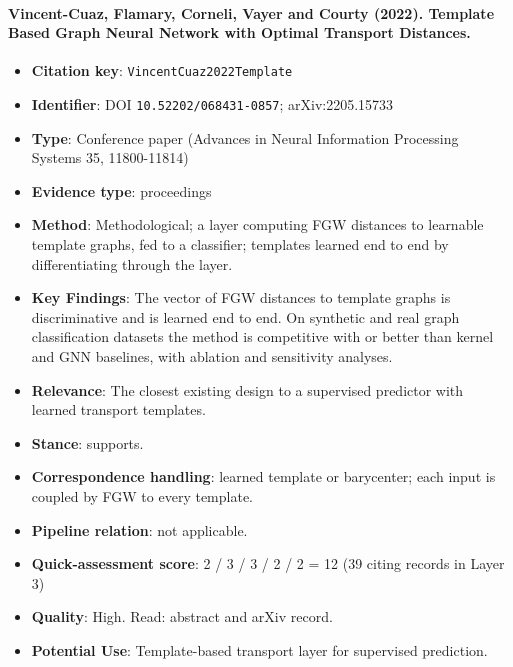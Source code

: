 \documentclass[journal,onecolumn]{IEEEtran}
\begin{document}
\paragraph{Vincent-Cuaz, Flamary, Corneli, Vayer and Courty (2022). Template Based Graph Neural Network with Optimal Transport Distances.~\cite{VincentCuaz2022Template}}\mbox{}

\begin{itemize}

\item{} \textbf{Citation key}: \texttt{VincentCuaz2022Template}

\item{} \textbf{Identifier}: DOI \nolinkurl{10.52202/068431-0857}; arXiv:2205.15733

\item{} \textbf{Type}: Conference paper (Advances in Neural Information Processing Systems 35, 11800-11814)

\item{} \textbf{Evidence type}: proceedings

\item{} \textbf{Method}: Methodological; a layer computing FGW distances to learnable template graphs, fed to a classifier; templates learned end to end by differentiating through the layer.

\item{} \textbf{Key Findings}: The vector of FGW distances to template graphs is discriminative and is learned end to end. On synthetic and real graph classification datasets the method is competitive with or better than kernel and GNN baselines, with ablation and sensitivity analyses.

\item{} \textbf{Relevance}: The closest existing design to a supervised predictor with learned transport templates.

\item{} \textbf{Stance}: supports.

\item{} \textbf{Correspondence handling}: learned template or barycenter; each input is coupled by FGW to every template.

\item{} \textbf{Pipeline relation}: not applicable.

\item{} \textbf{Quick-assessment score}: 2 / 3 / 3 / 2 / 2 = 12 (39 citing records in Layer 3)

\item{} \textbf{Quality}: High. Read: abstract and arXiv record.

\item{} \textbf{Potential Use}: Template-based transport layer for supervised prediction.

\end{itemize}
\end{document}
